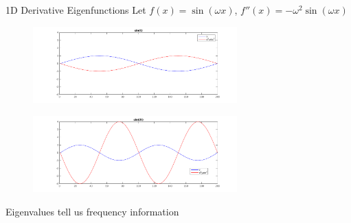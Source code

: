 \documentclass{beamer}
\begin{document}
\begin{frame}{1D Derivative Eigenfunctions}
Let $f(x) = \sin(\omega x)$, $f''(x) = -\omega^2 \sin(\omega x)$

\begin{figure}[t]
    \includegraphics[width=0.7\textwidth]{cost.pdf}
\end{figure}

\begin{figure}[t]
    \includegraphics[width=0.7\textwidth]{cos2ts.pdf}
\end{figure}

Eigenvalues tell us frequency information

\end{frame}
\end{document}
